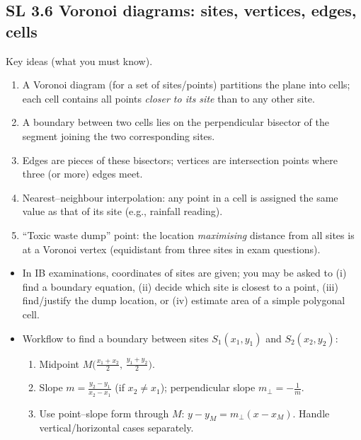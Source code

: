 \documentclass[11pt]{article}
\def\textbf#1{#1}%
\newcommand{\tocsubsection}[1]{\subsection{#1}}
\newcounter{question}
\begin{document}
\tocsubsection{SL 3.6 \quad Voronoi diagrams: sites, vertices, edges, cells}


\textbf{Key ideas (what you must know).}
\begin{enumerate}[itemsep=2pt]
  \item A \textbf{Voronoi diagram} (for a set of sites/points) partitions the plane into \textbf{cells}; each cell contains all points \emph{closer to its site} than to any other site.
  \item A boundary between two cells lies on the \textbf{perpendicular bisector} of the segment joining the two corresponding sites.
  \item \textbf{Edges} are pieces of these bisectors; \textbf{vertices} are intersection points where three (or more) edges meet.
  \item \textbf{Nearest–neighbour interpolation:} any point in a cell is assigned the same value as that of its site (e.g., rainfall reading).
  \item \textbf{“Toxic waste dump” point:} the location \emph{maximising} distance from all sites is at a Voronoi \textbf{vertex} (equidistant from three sites in exam questions).
\end{enumerate}



\begin{itemize}
  \item In IB examinations, coordinates of sites are given; you may be asked to (i) find a boundary equation, (ii) decide which site is closest to a point, (iii) find/justify the dump location, or (iv) estimate area of a simple polygonal cell.
  \item Workflow to find a boundary between sites $S_1(x_1,y_1)$ and $S_2(x_2,y_2)$:
  \begin{enumerate}[label=\arabic*.]
    \item Midpoint \(M\big(\frac{x_1+x_2}{2},\,\frac{y_1+y_2}{2}\big)\).
    \item Slope \(m=\frac{y_2-y_1}{x_2-x_1}\) (if \(x_2\neq x_1\)); perpendicular slope \(m_\perp=-\frac{1}{m}\).
    \item Use point–slope form through \(M\): \(y-y_M=m_\perp(x-x_M)\).  
          Handle vertical/horizontal cases separately.
  \end{enumerate}
\end{itemize}

\noindent
\end{document}
